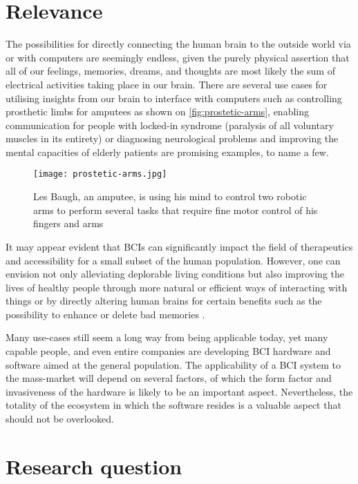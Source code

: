 \section{Relevance}
\label{chapter1-relevance}

The possibilities for directly connecting the human brain to the outside world via or with computers are seemingly endless, given the purely physical assertion that all of our feelings, memories, dreams, and thoughts are most likely the sum of electrical activities taking place in our brain. There are several use cases for utilising insights from our brain to interface with computers such as controlling prosthetic limbs for amputees as shown on \autoref{fig:prostetic-arms}, enabling communication for people with locked-in syndrome (paralysis of all voluntary muscles in its entirety) \citep{chaudhary_spelling_2022} or diagnosing neurological problems and improving the mental capacities of elderly patients \citep{belkacem_brain_2020} are promising examples, to name a few.

\begin{figure}[ht]
  \centering
  \texttt{[image: prostetic-arms.jpg]}
  \caption{Les Baugh, an amputee, is using his mind to control two robotic arms to perform several tasks that require fine motor control of his fingers and arms \citep{campbell_amputee_2014}}
  \label{fig:prostetic-arms}
\end{figure}

It may appear evident that BCIs can significantly impact the field of therapeutics and accessibility for a small subset of the human population. However, one can envision not only alleviating deplorable living conditions but also improving the lives of healthy people through more natural or efficient ways of interacting with things or by directly altering human brains for certain benefits such as the possibility to enhance or delete bad memories \citep{spiers_enhance_2014}.

Many use-cases still seem a long way from being applicable today, yet many capable people, and even entire companies are developing BCI hardware and software aimed at the general population. The applicability of a BCI system to the mass-market will depend on several factors, of which the form factor and invasiveness of the hardware is likely to be an important aspect. Nevertheless, the totality of the ecosystem in which the software resides is a valuable aspect that should not be overlooked.

\section{Research question}
\label{chapter1-research-question}

